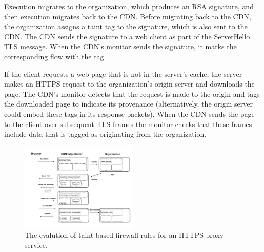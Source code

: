 %
Execution migrates to the organization, which produces an RSA signature, and
then execution migrates back to the CDN\@.
%
Before migrating back to the CDN, the organization assigns a taint tag to the
signature, which is also sent to the CDN\@.
%
The CDN sends the signature to a web client as part of the ServerHello TLS
message.
%
When the CDN's monitor sends the signature, it marks the corresponding flow
with the tag.


If the client requests a web page that is not in the server's cache, the server
makes an HTTPS request to the organization's origin server and downloads the
page.
%
The CDN's monitor detects that the request is made to the origin and tags the
downloaded page to indicate its provenance (alternatively, the origin server
could embed these tags in its response packets).
%
When the CDN sends the page to the client over subsequent TLS frames the
monitor checks that these frames include data that is tagged as originating
from the organization. 


\begin{figure}[t]
	\centering
    \includegraphics[width=0.5\textwidth]{figs/https-flowchart}
    \caption{The evalution of taint-based firewall rules for an HTTPS proxy
    service.}
	\label{fig:https-flowchart}
\end{figure}




